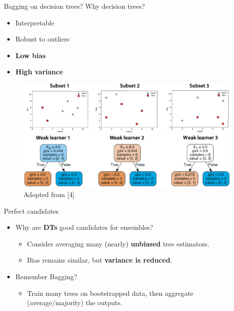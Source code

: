 \documentclass[serif, aspectratio=169]{beamer}
\begin{document}
\begin{frame}{Bagging on decision trees?}
    Why decision trees?
    \begin{itemize}
        \itemsep0.25em
        \justifying
        \item Interpretable
        \item Robust to outliers
        \item \textbf{Low bias}
        \item \textbf{High variance}
    \end{itemize}
    \endminipage
    \hfill
    \begin{figure}[!htb]
        \includegraphics[width=\linewidth]{pic/dt_plot.png} \\ \medskip
        \includegraphics[width=\linewidth]{pic/dt_tree.png}
        {\scriptsize Adopted from [4]}
    \end{figure}
    \endminipage
\end{frame}

\begin{frame}{Perfect candidates}
    \begin{itemize}
        \itemsep1em
        \justifying
        \item Why are \textbf{DTs} good candidates for ensembles?
        \begin{itemize}
            \itemsep0.25em
            \item Consider averaging many (nearly) \textbf{unbiased} tree estimators.
            \item Bias remains similar, but \textbf{variance is reduced}.
        \end{itemize}
        \item Remember Bagging?
        \begin{itemize}
            \item Train many trees on bootstrapped data, then aggregate (average/majority) the outputs.
        \end{itemize}
    \end{itemize}
\end{frame}
\end{document}
